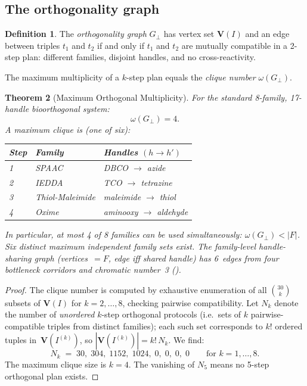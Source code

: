 \documentclass[preprint,12pt]{elsarticle}
\newtheorem{theorem}{Theorem}[section]
\theoremstyle{definition}
\newtheorem{definition}[theorem]{Definition}
\theoremstyle{remark}
\newcommand{\Var}{\mathbf{V}}
\begin{document}
\subsection{The orthogonality graph}

\begin{definition}\label{def:orth-graph}
The \emph{orthogonality graph} $G_\perp$ has vertex set
$\Var(I)$ and an edge between triples $t_1$ and $t_2$ if
and only if $t_1$ and $t_2$ are mutually compatible in a
2-step plan: different families, disjoint handles, and no
cross-reactivity.
\end{definition}

The maximum multiplicity of a $k$-step plan equals the
\emph{clique number} $\omega(G_\perp)$.

\begin{theorem}[Maximum Orthogonal Multiplicity]\label{thm:ortho}
For the standard 8-family, 17-handle bioorthogonal system:
\[
  \omega(G_\perp) = 4.
\]
A maximum clique is (one of six):
\begin{center}
\begin{tabular}{lll}
\toprule
Step & Family & Handles $(h \to h')$ \\
\midrule
1 & SPAAC & DBCO $\to$ azide \\
2 & IEDDA & TCO $\to$ tetrazine \\
3 & Thiol-Maleimide & maleimide $\to$ thiol \\
4 & Oxime & aminooxy $\to$ aldehyde \\
\bottomrule
\end{tabular}
\end{center}
In particular, at most 4 of 8 families can be used simultaneously:
$\omega(G_\perp) < |F|$.  Six distinct maximum independent family
sets exist.  The family-level handle-sharing graph
(vertices~$= F$, edge iff shared handle) has 6~edges from four
bottleneck corridors and chromatic number~3
().
\end{theorem}

\begin{proof}
The clique number is computed by exhaustive enumeration of all
$\binom{30}{k}$ subsets of $\Var(I)$ for $k = 2, \ldots, 8$,
checking pairwise compatibility.  Let $N_k$ denote the number
of \emph{unordered} $k$-step orthogonal protocols (i.e.\ sets of
$k$ pairwise-compatible triples from distinct families); each
such set corresponds to $k!$ ordered tuples in~$\Var(I^{(k)})$,
so $|\Var(I^{(k)})| = k!\, N_k$.  We find:
\[
  N_k \;=\; 30,\; 304,\; 1152,\; 1024,\; 0,\; 0,\; 0,\; 0
  \qquad \text{for } k = 1, \ldots, 8.
\]
The maximum clique size is $k = 4$.  The vanishing of
$N_5$ means no 5-step orthogonal plan exists.
\end{proof}
\end{document}
